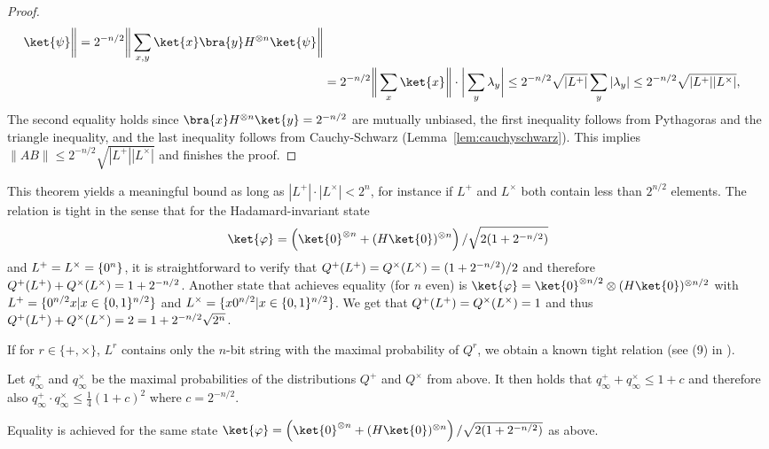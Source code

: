 \begin{proof}
\begin{align*}
\ket{\psi}
\bigg\| 
= 2^{-n/2} \bigg\| \sum_{x,y} \ket{x}\bra{y}H^{\otimes n}  
\ket{\psi}
\bigg\|
  \\
&= 2^{-n/2} \bigg\| \sum_{x} \ket{x} \bigg\| \cdot \bigg|  \sum_{y} \lambda_y
  \bigg| 
\leq 2^{-n/2} \sqrt{|L^+|} \sum_{y} |\lambda_y| 
\leq 2^{-n/2} \sqrt{|L^+| |L^{\times}|},
\end{align*}
The second equality holds since $\bra{x}H^{\otimes n}\ket{y}=2^{-n/2}$
are mutually unbiased, the first inequality follows from Pythagoras
and the triangle inequality, and the last inequality follows from
Cauchy-Schwarz (Lemma~\ref{lem:cauchyschwarz}).  
This implies $\|AB\| \leq 2^{-n/2} \sqrt{|L^+|
  |L^{\times}|}$ and finishes the proof.
\end{proof}

This theorem yields a meaningful bound as long as $|L^+| \cdot
|L^{\times}| < 2^n$, for instance if $L^+$ and
$L^{\times}$ both contain less than $2^{n/2}$ elements. The relation
is tight in the sense that for the Hadamard-invariant state
$$\ket{\varphi} = \left(\ket{0}^{\otimes n} + (H\ket{0})^{\otimes n}
\right)/\sqrt{2(1+2^{-n/2})}$$
and $L^+ = L^{\times} = \{0^n\}$, it
is straightforward to verify that $Q^{+}(L^+) = Q^{\times}(L^{\times}) = (1 +
2^{-n/2})/2$ and therefore $Q^{+}(L^+) + Q^{\times}(L^{\times}) = 1 +
2^{-n/2}$. Another state that achieves equality (for $n$ even) is $\ket{\varphi} =
\ket{0}^{\otimes n/2} \otimes ( H \ket{0} )^{\otimes n/2}$ with $L^+ =
\{0^{n/2}x | x \in \{0,1\}^{n/2}\}$ and $L^{\times} = \{x
  0^{n/2} | x \in \{0,1\}^{n/2}\}$. We get that $Q^{+}(L^+) =
Q^{\times}(L^{\times}) = 1$ and thus $Q^{+}(L^+) + Q^{\times}(L^{\times}) = 2 = 1 + 2^{-n/2}
\sqrt{2^n}$.

If for $r \in
\{+,\times \}$, $L^{r}$ contains only the $n$-bit string with the
maximal probability of $Q^{r}$, we obtain a known tight relation (see (9) in \cite{MU88}).
\begin{corollary}\label{cor:pmax}
Let $q_{\infty}^+$ and $q_{\infty}^{\times}$ be the maximal
probabilities of the distributions $Q^+$ and $Q^{\times}$ from
above. It then holds that $q_{\infty}^+ + q_{\infty}^{\times} \leq
1+c$ and therefore also $q_{\infty}^+ \cdot q_{\infty}^{\times} \leq
\frac{1}{4} (1+c)^2$ where $c=2^{-n/2}$.
\end{corollary}
Equality is achieved for the same state $\ket{\varphi} = \left(\ket{0}^{\otimes n} + (H\ket{0})^{\otimes n}
\right)/\sqrt{2(1+2^{-n/2})}$ as above. 

